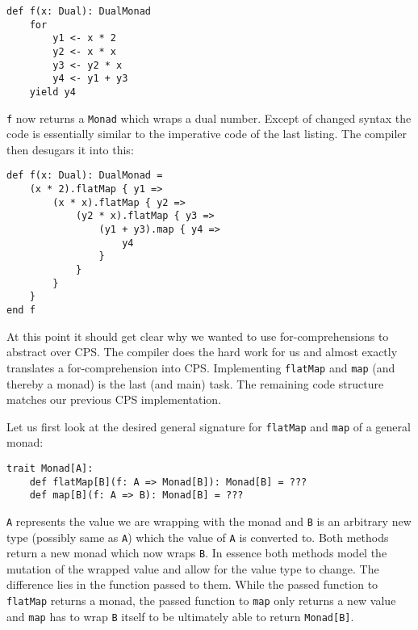 \pagebreak
\begin{lstlisting}
def f(x: Dual): DualMonad
    for
        y1 <- x * 2
        y2 <- x * x
        y3 <- y2 * x
        y4 <- y1 + y3
    yield y4    
\end{lstlisting}
\lstinline{f} now returns a \lstinline{Monad} which wraps a dual number. Except of changed syntax the code is essentially similar to the imperative code of the last listing. The compiler then desugars it into this:
\begin{lstlisting}[caption={Desugared for-comprehension}, label={lst:desugaredForComprehension}]
def f(x: Dual): DualMonad =
    (x * 2).flatMap { y1 =>
        (x * x).flatMap { y2 =>
            (y2 * x).flatMap { y3 =>
                (y1 + y3).map { y4 =>
                    y4
                }
            }
        }
    }
end f  
\end{lstlisting}
At this point it should get clear why we wanted to use for-comprehensions to abstract over CPS. The compiler does the hard work for us and almost exactly translates a for-comprehension into CPS. Implementing \lstinline{flatMap} and \lstinline{map} (and thereby a monad) is the last (and main) task. The remaining code structure matches our previous CPS implementation.

Let us first look at the desired general signature for \lstinline{flatMap} and \lstinline{map} of a general monad:
\begin{lstlisting}
trait Monad[A]:
    def flatMap[B](f: A => Monad[B]): Monad[B] = ???
    def map[B](f: A => B): Monad[B] = ???
\end{lstlisting}
\lstinline{A} represents the value we are wrapping with the monad and \lstinline{B} is an arbitrary new type (possibly same as \lstinline{A}) which the value of \lstinline{A} is converted to. Both methods return a new monad which now wraps \lstinline{B}. In essence both methods model the mutation of the wrapped value and allow for the value type to change. The difference lies in the function passed to them. While the passed function to \lstinline{flatMap} returns a monad, the passed function to \lstinline{map} only returns a new value and \lstinline{map} has to wrap \lstinline{B} itself to be ultimately able to return \lstinline{Monad[B]}. 

